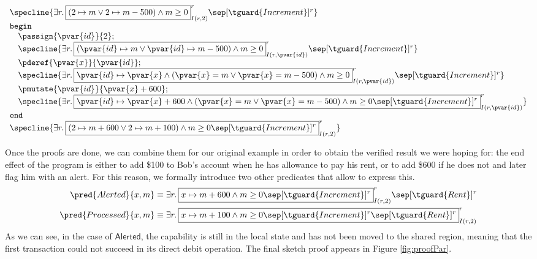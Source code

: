 \begin{center}
\[
	\begin{array}{l}
		\specline{
			\exists r \ldotp
				\boxed{
					\left( 2 \mapsto m \lor 2 \mapsto m - 500 \right) \land m \geq 0
				}^r_{I(r, 2)}
				\sep [\tguard{Increment}]^r
		} \\
		\mathtt{begin} \\
			\quad \passign{\pvar{id}}{2}; \\
			\quad \specline{
				\exists r \ldotp
					\boxed{
						\left( \pvar{id} \mapsto m \lor \pvar{id} \mapsto m - 500\right) \land m \geq 0
					}^r_{I(r, \pvar{id})}
					\sep [\tguard{Increment}]^r
			} \\
			\quad \pderef{\pvar{x}}{\pvar{id}}; \\
			\quad \specline{
				\exists r \ldotp
					\boxed{
						\pvar{id} \mapsto \pvar{x} \land \left( \pvar{x} = m \lor \pvar{x} = m - 500 \right) \land m \geq 0
					}^r_{I(r, \pvar{id})}
					\sep [\tguard{Increment}]^r
			} \\
			\quad \pmutate{\pvar{id}}{\pvar{x} + 600}; \\
			\quad \specline{
				\exists r \ldotp
					\boxed{
						\pvar{id} \mapsto \pvar{x} + 600 \land \left( \pvar{x} = m \lor \pvar{x} = m - 500 \right) \land m \geq 0
						\sep [\tguard{Increment}]^r
					}^r_{I(r, \pvar{id})}
			} \\
		\mathtt{end} \\
		\specline{
				\exists r \ldotp
					\boxed{
						\left(2 \mapsto m + 600 \lor 2 \mapsto m + 100 \right) \land m \geq 0
						\sep [\tguard{Increment}]^r
					}^r_{I(r, 2)}
		}
	\end{array}
\]
\label{fig:proofR}
\end{center}
Once the proofs are done, we can combine them for our original example in order to obtain the verified result we were hoping for: the end effect of the program is either to add \$100 to Bob's account when he has allowance to pay his rent, or to add \$600 if he does not and later flag him with an alert. For this reason, we formally introduce two other predicates that allow to express this.
\begin{align*}
	\pred{Alerted}{x, m}
		&\equiv
	\exists r \ldotp
		\boxed{
			x \mapsto m + 600 \land m \geq 0
			\sep [\tguard{Increment}]^r
		}^r_{I(r, 2)}
		\sep [\tguard{Rent}]^r
	\\
	\pred{Processed}{x, m}
		&\equiv
	\exists r \ldotp
		\boxed{
			x \mapsto m + 100 \land m \geq 0
			\sep [\tguard{Increment}]^r
			\sep [\tguard{Rent}]^r
		}^r_{I(r, 2)}
\end{align*}
As we can see, in the case of $\mathsf{Alerted}$, the  capability is still in the local state and has not been moved to the shared region, meaning that the first transaction could not succeed in its direct debit operation. The final sketch proof appears in Figure \ref{fig:proofPar}.

